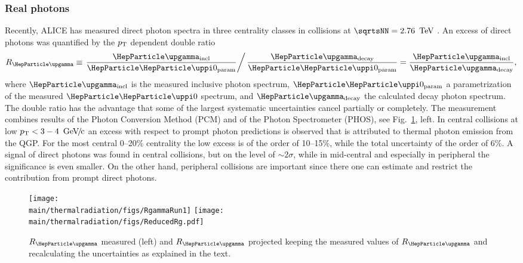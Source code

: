\subsubsection{Real photons}

Recently, ALICE has measured direct photon spectra in three centrality classes in \PbPb collisions at $\sqrtsNN=\unit[2.76]{\UTeV}$ \cite{Adam:2015lda}. 
An excess of direct photons
was quantified by the $p\sb{\scriptstyle\mathrm{T}}$ dependent double ratio
\begin{equation}
  \label{eq:doubleratio}
  R_{\PGg}  \equiv \left . \frac{\PGg_{\mathrm{incl}}}{\PGpz_{\mathrm{param}}} \right / \frac{\PGg_{\mathrm{decay}}}{\PGpz_{\mathrm{param}}}
 = \frac{\PGg_{\mathrm{incl}}}{\PGg_{\mathrm{decay}}}, 
\end{equation}
where $\PGg_{\mathrm{incl}}$ is the measured inclusive photon spectrum, $\PGpz_{\mathrm{param}}$ a parametrization of the measured $\PGpz$ spectrum, and $\PGg_{\mathrm{decay}}$ the calculated decay photon spectrum. The double ratio has the advantage that some of the largest systematic uncertainties cancel partially or completely. 
The measurement combines results of the Photon Conversion Method (PCM) and of the Photon Spectrometer (PHOS), see Fig.~\ref{fig:RealPhotonsRg}, left. In central collisions at low $\pT  < \unit[3-4]{\UGeVc}$ an excess with respect to prompt photon predictions is observed that is attributed to thermal photon emission from the QGP. For the most central 0--20\% centrality the low \pT{} excess is of the order of 10--15\%, while the total uncertainty of the order of 6\%. A signal of direct photons was found in central collisions, but on the level of $\sim 2\sigma$, while in mid-central and especially in peripheral the significance is even smaller. On the other hand, peripheral collisions are important since there one can estimate and restrict the contribution from prompt direct photons.  

\begin{figure}[hbt]
\centering
\texttt{[image: \\main/thermalradiation/figs/RgammaRun1]}
\hfill
\texttt{[image: \\main/thermalradiation/figs/ReducedRg.pdf]}
\caption{$R_{\PGg}$ measured \cite{Adam:2015lda} (left) and $R_{\PGg}$ projected keeping the measured values of $R_{\PGg}$ and recalculating the uncertainties as explained in the text.}
\label{fig:RealPhotonsRg}
\end{figure}

